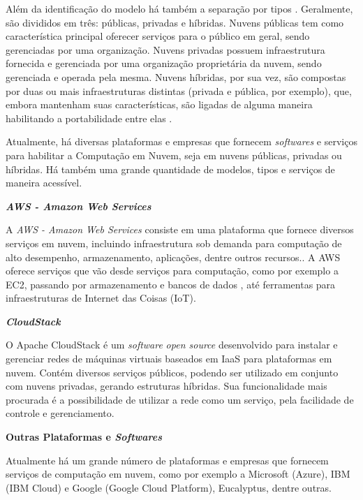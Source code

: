 Além da identificação do modelo há também a separação por tipos \cite{zhang2010cloud}. Geralmente, são divididos em três: públicas, privadas e híbridas. Nuvens públicas tem como característica principal oferecer serviços para o público em geral, sendo gerenciadas por uma organização. Nuvens privadas possuem infraestrutura fornecida e gerenciada por uma organização proprietária da nuvem, sendo gerenciada e operada pela mesma. Nuvens híbridas, por sua vez, são compostas por duas ou mais infraestruturas distintas (privada e pública, por exemplo), que, embora mantenham suas características, são ligadas de alguma maneira habilitando a portabilidade entre elas\cite{mell2011nist} \cite{zhang2010cloud} \cite{Bhaskar}.

Atualmente, há diversas plataformas e empresas que fornecem \textit{softwares} e serviços para habilitar a Computação em Nuvem, seja em nuvens públicas, privadas ou híbridas. Há também uma grande quantidade de modelos, tipos e serviços de maneira acessível. 
\newline

\textbf{\textit{{AWS - Amazon Web Services}}}

A \textit{{AWS - Amazon Web Services}} consiste em uma plataforma que fornece diversos serviços em nuvem, incluindo infraestrutura sob demanda para computação de alto desempenho, armazenamento, aplicações, dentre outros recursos.\cite{AmazonSolutions}. A AWS oferece serviços que vão desde serviços para computação, como por exemplo a EC2\cite{AmazonEC2}, passando por armazenamento e bancos de dados \cite{AmazonDB}, até ferramentas para infraestruturas de Internet das Coisas (IoT)\cite{AmazonIoT}. 
\newline

\textbf{\textit{{CloudStack}}}

O Apache CloudStack é um \textit{software} \textit{open source} desenvolvido para instalar e gerenciar redes de máquinas virtuais baseados em IaaS para plataformas em nuvem. Contém diversos serviços públicos, podendo ser utilizado em conjunto com nuvens privadas, gerando estruturas híbridas. Sua funcionalidade mais procurada é a possibilidade de utilizar a rede como um serviço, pela facilidade de controle e gerenciamento. 
\newline

\textbf{Outras Plataformas e \textit{Softwares}}

Atualmente há um grande número de plataformas e empresas que fornecem serviços de computação em nuvem, como por exemplo a Microsoft (Azure), IBM (IBM Cloud) e Google (Google Cloud Platform), Eucalyptus, dentre outras.


